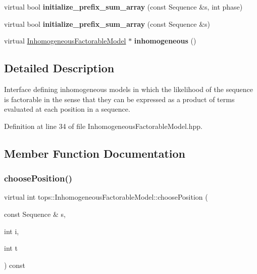 \begin{DoxyCompactItemize}
virtual bool {\bfseries initialize\+\_\+prefix\+\_\+sum\+\_\+array} (const Sequence \&s, int phase)
\item 
\mbox{\label{classtops_1_1InhomogeneousFactorableModel_a01d9b27d2744068d565ff059c72b0279}} 
virtual bool {\bfseries initialize\+\_\+prefix\+\_\+sum\+\_\+array} (const Sequence \&s)
\item 
\mbox{\label{classtops_1_1InhomogeneousFactorableModel_a71543266c16733298e17e657f7d1d3ef}} 
virtual \hyperlink{classtops_1_1InhomogeneousFactorableModel}{Inhomogeneous\+Factorable\+Model} $\ast$ {\bfseries inhomogeneous} ()
\end{DoxyCompactItemize}


\subsection{Detailed Description}
Interface defining inhomogeneous models in which the likelihood of the sequence is factorable in the sense that they can be expressed as a product of terms evaluated at each position in a sequence. 

Definition at line 34 of file Inhomogeneous\+Factorable\+Model.\+hpp.



\subsection{Member Function Documentation}
\mbox{\label{classtops_1_1InhomogeneousFactorableModel_ab5cba15522b91a4036e6966f774e9989}} 
\subsubsection{\texorpdfstring{choose\+Position()}{choosePosition()}}
{\footnotesize\ttfamily virtual int tops\+::\+Inhomogeneous\+Factorable\+Model\+::choose\+Position (\begin{DoxyParamCaption}\item[{const Sequence \&}]{s,  }\item[{int}]{i,  }\item[{int}]{t }\end{DoxyParamCaption}) const\hspace{0.3cm}{\ttfamily [pure virtual]}}



